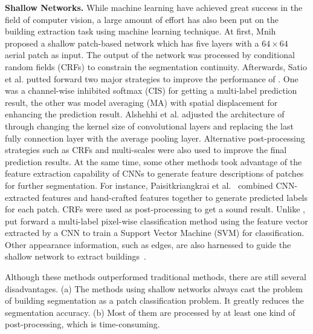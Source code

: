 \noindent\textbf{Shallow Networks.}
While machine learning have achieved great success in the field of computer vision, a large amount of effort has also been put on the building extraction task using machine learning technique.
At first, Mnih \cite{IEEEexample:mnih2013machine} proposed a shallow patch-based network which has five layers with a $64\times 64$ aerial patch as input.
The output of the network was processed by conditional random fields (CRFs) to constrain the segmentation continuity.
Afterwards, Satio et al. \cite{IEEEexample:saito2016multiple} putted forward two major strategies to improve the performance of \cite{IEEEexample:mnih2013machine}.
One was a channel-wise inhibited softmax (CIS) for getting a multi-label prediction result, the other was model averaging (MA) with spatial displacement for enhancing the prediction result.
Alshehhi et al. \cite{IEEEexample:alshehhi2017simultaneous} adjusted the architecture of \cite{IEEEexample:mnih2013machine} through changing the kernel size of convolutional layers and replacing the last fully connection layer with the average pooling layer.
Alternative post-processing strategies such as CRFs and multi-scales were also used to improve the final prediction results.
At the same time, some other methods took advantage of the feature extraction capability of CNNs to generate feature descriptions of patches for further segmentation.
For instance, Paisitkriangkrai et al.~\cite{IEEEexample:paisitkriangkrai2015effective} combined CNN-extracted features and hand-crafted features together to generate predicted labels for each patch.
CRFs were used as post-processing to get a sound result.
Unlike \cite{IEEEexample:paisitkriangkrai2015effective}, \cite{IEEEexample:he2017multi} put forward a multi-label pixel-wise classification method using the feature vector extracted by a CNN to train a Support Vector Machine (SVM) for classification.
Other appearance information, such as edges, are also harnessed to guide the shallow network to extract buildings~\cite{IEEEexample:zhao2017contextually}.


Although these methods outperformed traditional methods, there are still several disadvantages.
(a) The methods using shallow networks always cast the problem of building segmentation as a patch classification problem. It greatly reduces the segmentation accuracy.
(b) Most of them are processed by at least one kind of post-processing, which is time-consuming.

